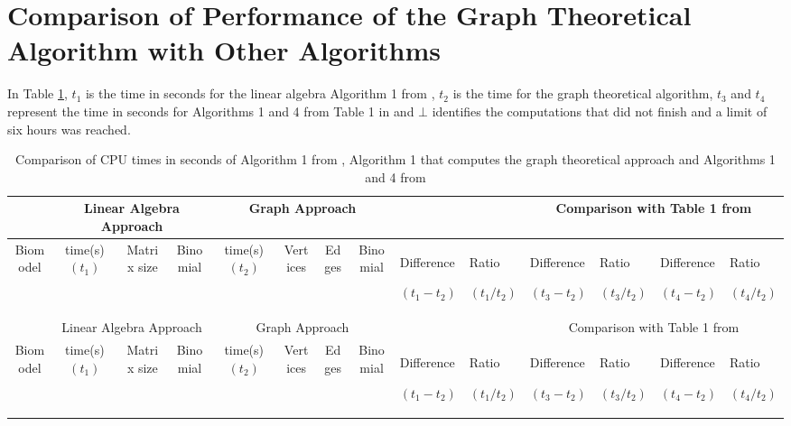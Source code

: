 \documentclass[11pt]{article}
\begin{document}
\section*{Comparison of Performance of the Graph Theoretical Algorithm with Other Algorithms}
In Table \ref{t:res}, $t_{1}$ is the time in seconds for the linear algebra Algorithm 1 from \cite{rahkooy2020linear}, $t_{2}$ is the time for the graph theoretical algorithm, $t_{3}$ and $t_{4}$ represent the time in seconds for Algorithms 1 and 4 from Table 1 in \cite{grigoriev2019efficiently} and $\bot$ identifies the computations that did not finish and a limit of six hours was reached.

\begin{landscape}
\setlength{\tabcolsep}{2pt}
\begin{small}
\begin{longtable}[c]{| c | c | c | c |c |c |c |c |p{1.5cm} |p{1.5cm} |p{1.5cm} |p{1.5cm} |p{1.5cm} |p{1.5cm} |}

 \caption{Comparison of CPU times in seconds of Algorithm 1 from \cite{rahkooy2020linear}, Algorithm 1 that computes the graph theoretical approach and Algorithms 1 and 4 from \cite{grigoriev2019efficiently}\label{t:res}}\\

 \hline
  & \multicolumn{3}{|c|}{Linear Algebra Approach} & \multicolumn{4}{|c|}{Graph Approach} &\multicolumn{2}{|c|}{}&\multicolumn{4}{|c|}{Comparison with Table 1 from \cite{grigoriev2019efficiently}}\\
 \hline
 Biomodel & time(s)$(t_{1})$ & Matrix size & Binomial &  time(s)$(t_{2})$ & Vertices & Edges &Binomial & Difference \par$(t_{1}-t_{2})$ & Ratio\par$(t_{1}/t_{2})$ & Difference \par$(t_{3}-t_{2})$&Ratio\par$(t_{3}/t_{2})$ &Difference\par$(t_{4}-t_{2})$ &Ratio\par$(t_{4}/t_{2})$\\
 \hline
 \endfirsthead

 \hline
 &\multicolumn{3}{|c|}{Linear Algebra Approach}& \multicolumn{4}{|c|}{Graph Approach}&\multicolumn{2}{|c|}{}&\multicolumn{4}{|c|}{Comparison with Table 1 from \cite{grigoriev2019efficiently} }\\
 \hline
 Biomodel & time(s)$(t_{1})$ & Matrix size & Binomial& time(s)$(t_{2})$ & Vertices & Edges &Binomial& Difference\par$(t_{1}-t_{2})$ & Ratio\par$(t_{1}/t_{2})$& Difference\par$(t_{3}-t_{2})$&Ratio\par$(t_{3}/t_{2})$ &Difference\par$(t_{4}-t_{2})$ &Ratio\par$(t_{4}/t_{2})$\\
 \hline
 \endhead


\end{longtable}
\end{small}
\end{landscape}
\end{document}
